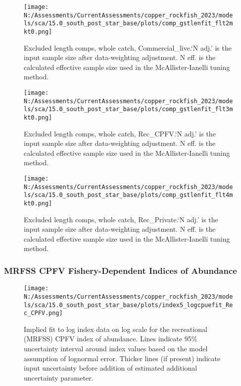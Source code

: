 \documentclass[11pt,
  english,
  letterpaper,
]{article}
\begin{document}
\begin{figure}
\centering
\texttt{[image: N:/Assessments/CurrentAssessments/copper\_rockfish\_2023/models/sca/15.0\_south\_post\_star\_base/plots/comp\_gstlenfit\_flt2mkt0.png]}
\caption{Excluded length comps, whole catch, Commercial\_live.`N adj.' is the input sample size after data-weighting adjustment. N eff. is the calculated effective sample size used in the McAllister-Ianelli tuning method.\label{fig:comp_gstlenfit_flt2mkt0}}
\end{figure}

\begin{figure}
\centering
\texttt{[image: N:/Assessments/CurrentAssessments/copper\_rockfish\_2023/models/sca/15.0\_south\_post\_star\_base/plots/comp\_gstlenfit\_flt3mkt0.png]}
\caption{Excluded length comps, whole catch, Rec\_CPFV.`N adj.' is the input sample size after data-weighting adjustment. N eff. is the calculated effective sample size used in the McAllister-Ianelli tuning method.\label{fig:comp_gstlenfit_flt3mkt0}}
\end{figure}

\begin{figure}
\centering
\texttt{[image: N:/Assessments/CurrentAssessments/copper\_rockfish\_2023/models/sca/15.0\_south\_post\_star\_base/plots/comp\_gstlenfit\_flt4mkt0.png]}
\caption{Excluded length comps, whole catch, Rec\_Private.`N adj.' is the input sample size after data-weighting adjustment. N eff. is the calculated effective sample size used in the McAllister-Ianelli tuning method.\label{fig:comp_gstlenfit_flt4mkt0}}
\end{figure}

\pagebreak

\hypertarget{mrfss-cpfv-fishery-dependent-indices-of-abundance}{%
\subsubsection{MRFSS CPFV Fishery-Dependent Indices of Abundance}\label{mrfss-cpfv-fishery-dependent-indices-of-abundance}}

\begin{figure}
\centering
\texttt{[image: N:/Assessments/CurrentAssessments/copper\_rockfish\_2023/models/sca/15.0\_south\_post\_star\_base/plots/index5\_logcpuefit\_Rec\_CPFV.png]}
\caption{Implied fit to log index data on log scale for the recreational (MRFSS) CPFV index of abundance. Lines indicate 95\% uncertainty interval around index values based on the model assumption of lognormal error. Thicker lines (if present) indicate input uncertainty before addition of estimated additional uncertainty parameter.\label{fig:mrfss-cpfv-index-fit}}
\end{figure}
\end{document}
